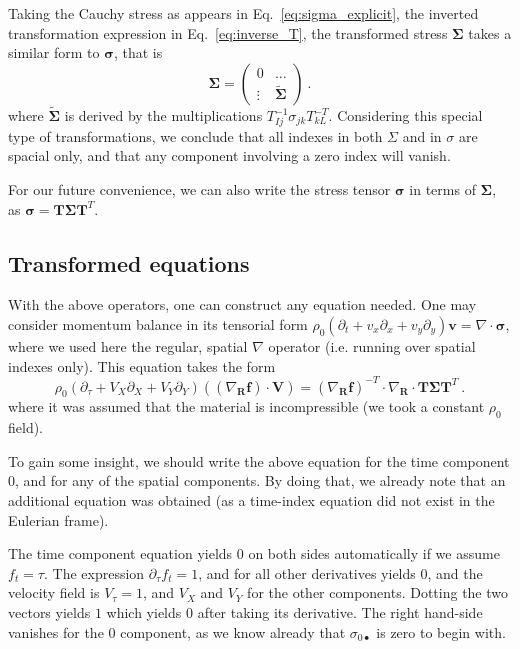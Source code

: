\documentclass[12pt,a4paper]{article}
\begin{document}
 Taking the Cauchy stress as appears in Eq.~\eqref{eq:sigma_explicit}, the inverted transformation expression in Eq.~\eqref{eq:inverse_T}, the transformed stress $\bm{\Sigma}$ takes a similar form to $\bm{\sigma}$, that is
\begin{equation}\label{eq:Sigma_explicit}
  \bm{\Sigma} = \left(\begin{array}{cc}
                   0 & \ldots \\
                   \vdots & \tilde{\bm{\Sigma}}
                 \end{array}\right) \ .
\end{equation}
where $\tilde{\bm{\Sigma}}$ is derived by the multiplications $T_{Ij}^{-1}\sigma_{jk}T_{kL}^{-T}$. Considering this special type of transformations, we conclude that all indexes in both $\Sigma$ and in $\sigma$ are spacial only, and that any component involving a zero index will vanish.

For our future convenience, we can also write the stress tensor $\bm{\sigma}$ in terms of $\bm{\Sigma}$, as $\bm{\sigma}=\bm{T} \bm{\Sigma} \bm{T}^T$.

\subsection{Transformed equations} \label{sse:T_equations}
With the above operators, one can construct any equation needed. One may consider momentum balance in its tensorial form $\rho_0 \left(\partial_t + v_x\partial_x +v_y\partial_y \right)\bm{v} = \nabla\cdot\bm{\sigma}$, where we used here the regular, spatial $\nabla$ operator (i.e. running over spatial indexes only). This equation takes the form
\begin{equation}\label{eq:momentum_balance_new}
  \rho_0 \left(\partial_\tau + V_X\partial_X +V_Y\partial_Y \right)\left(\left(\nabla_{\bm{R}} \bm{f}\right) \cdot \bm{V}\right) = \left(\nabla_{\bm{R}} \bm{f}\right)^{-T}\cdot \nabla_{\bm{R}}\cdot \bm{T} \bm{\Sigma} \bm{T}^T \ .
\end{equation}
where it was assumed that the material is incompressible (we took a constant $\rho_0$ field).

To gain some insight, we should write the above equation for the time component $0$, and for any of the spatial components. By doing that, we already note that an additional equation was obtained (as a time-index equation did not exist in the Eulerian frame).

The time component equation yields $0$ on both sides automatically if we assume $f_t=\tau$. The expression $\partial_\tau f_t=1$, and for all other derivatives yields $0$, and the velocity field is $V_\tau = 1$, and $V_X$ and $V_Y$ for the other components. Dotting the two vectors yields $1$ which yields $0$ after taking its derivative. The right hand-side vanishes for the $0$ component, as we know already that $\sigma_{0\bullet}$ is zero to begin with.
\end{document}
